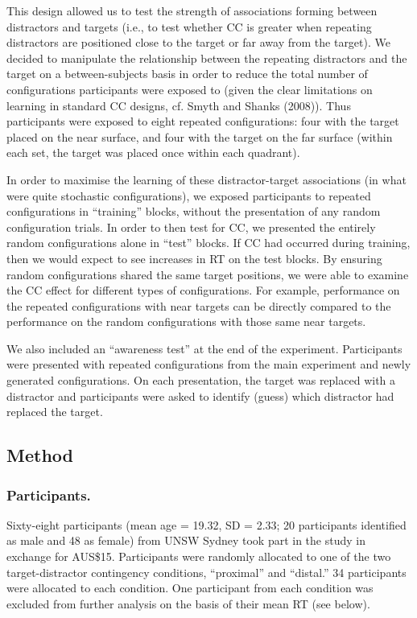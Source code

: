 \documentclass[
  english,
  man,floatsintext]{apa7}
\begin{document}
This design allowed us to test the strength of associations forming between distractors and targets (i.e., to test whether CC is greater when repeating distractors are positioned close to the target or far away from the target). We decided to manipulate the relationship between the repeating distractors and the target on a between-subjects basis in order to reduce the total number of configurations participants were exposed to (given the clear limitations on learning in standard CC designs, cf. Smyth and Shanks (2008)). Thus participants were exposed to eight repeated configurations: four with the target placed on the near surface, and four with the target on the far surface (within each set, the target was placed once within each quadrant).

In order to maximise the learning of these distractor-target associations (in what were quite stochastic configurations), we exposed participants to repeated configurations in ``training'' blocks, without the presentation of any random configuration trials. In order to then test for CC, we presented the entirely random configurations alone in ``test'' blocks. If CC had occurred during training, then we would expect to see increases in RT on the test blocks. By ensuring random configurations shared the same target positions, we were able to examine the CC effect for different types of configurations. For example, performance on the repeated configurations with near targets can be directly compared to the performance on the random configurations with those same near targets.

We also included an ``awareness test'' at the end of the experiment. Participants were presented with repeated configurations from the main experiment and newly generated configurations. On each presentation, the target was replaced with a distractor and participants were asked to identify (guess) which distractor had replaced the target.

\hypertarget{method-2}{%
\subsection{Method}\label{method-2}}

\hypertarget{participants.-2}{%
\subsubsection{Participants.}\label{participants.-2}}

Sixty-eight participants (mean age = 19.32, SD = 2.33; 20 participants identified as male and 48 as female) from UNSW Sydney took part in the study in exchange for AUS\$15. Participants were randomly allocated to one of the two target-distractor contingency conditions, ``proximal'' and ``distal.'' 34 participants were allocated to each condition. One participant from each condition was excluded from further analysis on the basis of their mean RT (see below).
\end{document}
